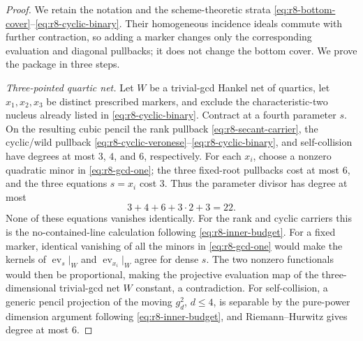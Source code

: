 \begin{proof}
We retain the notation and the scheme-theoretic strata
\eqref{eq:r8-bottom-cover}--\eqref{eq:r8-cyclic-binary}.  Their
homogeneous incidence ideals commute with further
contraction, so adding a marker changes only the corresponding
evaluation and diagonal pullbacks; it does not change the bottom
cover.  We prove the package in three steps.

\emph{Three-pointed quartic net.}
Let $W$ be a trivial-gcd Hankel net of quartics, let
$x_1,x_2,x_3$ be distinct prescribed markers, and exclude the
characteristic-two nucleus already listed in
\eqref{eq:r8-cyclic-binary}.  Contract at a
fourth parameter $s$.  On the resulting cubic pencil the rank
pullback \eqref{eq:r8-secant-carrier}, the cyclic/wild pullback
\eqref{eq:r8-cyclic-veronese}--\eqref{eq:r8-cyclic-binary}, and
self-collision
have degrees at most $3$, $4$, and $6$, respectively.  For each
$x_i$, choose a nonzero quadratic minor in \eqref{eq:r8-gcd-one}; the
three fixed-root
pullbacks cost at most $6$, and the three equations $s=x_i$ cost $3$.
Thus the parameter divisor has degree at most
\begin{equation}\label{eq:r9-three-point-budget}
             3+4+6+3\cdot2+3=22.
\end{equation}
None of these equations vanishes identically.  For the rank and
cyclic carriers this is the no-contained-line calculation following
\eqref{eq:r8-inner-budget}.  For a fixed marker, identical vanishing
of all the minors in \eqref{eq:r8-gcd-one} would make the kernels of
$\operatorname{ev}_{s}|_W$ and $\operatorname{ev}_{x_i}|_W$ agree
for dense $s$.  The two nonzero functionals would then be
proportional, making the projective evaluation map of the
three-dimensional trivial-gcd net $W$ constant, a contradiction.
For self-collision, a generic pencil projection of the moving
$g^2_d$, $d\leq4$, is separable by the pure-power dimension argument
following \eqref{eq:r8-inner-budget}, and Riemann--Hurwitz gives
degree at most $6$.


\end{proof}
